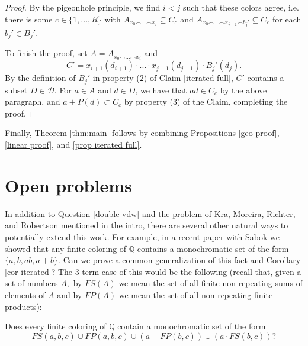 \documentclass[tocmacros]{daj}
\begin{document}
\begin{proof}
By the pigeonhole principle, we find $i<j$ such that these colors agree, i.e. there is some $c\in \{1,...,R\}$ with $A_{x_0\smallfrown...\smallfrown x_i}\subseteq C_c$ and $A_{x_0\smallfrown...\smallfrown x_{j-1}\smallfrown b_j'}\subseteq C_c$ for each $b_j'\in B_j'.$

To finish the proof, set $A=A_{x_0\smallfrown...\smallfrown x_i}$ and $$C'=x_{i+1}(d_{i+1})\cdot ...\cdot x_{j-1}(d_{j-1})\cdot B_j'(d_j).$$  By the definition of $B_j'$ in property (2) of Claim \ref{iterated full}, $C'$ contains a subset $D\in\mathcal{D}$.  For $a\in A$ and $d\in D$, we have that $ad\in C_c$ by the above paragraph, and $a+P(d)\subset C_c$ by property (3) of the Claim, completing the proof.
\end{proof}

Finally, Theorem \ref{thm:main} follows by combining Propositions \ref{geo proof}, \ref{linear proof}, and \ref{prop iterated full}.

\section{Open problems}

In addition to Question \ref{double vdw} and the problem of Kra, Moreira, Richter, and Robertson mentioned in the intro, there are several other natural ways to potentially extend this work.  For example, in a recent paper with Sabok \cite{bowen.sabok} we showed that any finite coloring of $\mathbb{Q}$ contains a monochromatic set of the form $\{a,b,ab,a+b\}.$  Can we prove a common generalization of this fact and Corollary \ref{cor iterated}?  The $3$ term case of this would be the following (recall that, given a set of numbers $A,$ by $FS(A)$ we mean the set of all finite non-repeating sums of elements of $A$ and by $FP(A)$ we mean the set of all non-repeating finite products):

\begin{question}
Does every finite coloring of $\mathbb{Q}$ contain a monochromatic set of the form $$FS(a,b,c)\cup FP(a,b,c)\cup (a+ FP(b,c))\cup (a\cdot FS(b,c))?$$
\end{question}

\end{document}
